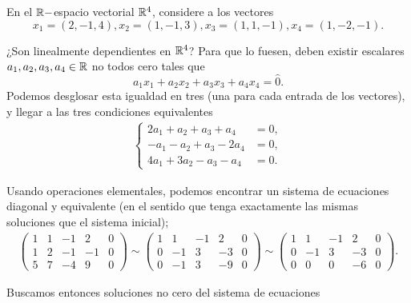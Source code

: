 \QEDB
\vspace{0.2cm}


\begin{ejem}
En el $\mathbb{R}-$espacio vectorial $\mathbb{R}^{4}$, considere a los vectores
\[
x_{1} = (2, -1, 4), x_{2} = (1, -1, 3),
x_{3} = (1, 1, -1), x_{4} = (1, -2, -1).
\]
\end{ejem}
¿Son linealmente dependientes en $\mathbb{R}^{4}$? Para que lo fuesen, 
deben existir escalares $a_{1}, a_{2}, a_{3}, a_{4} \in \mathbb{R}$
no todos cero tales que 
\[
a_{1} x_{1} + a_{2} x_{2} + a_{3}x_{3} + a_{4}x_{4} = 
\hat{0}.
\]
Podemos desglosar esta igualdad en tres (una para cada entrada
de los vectores), y llegar a las tres condiciones equivalentes
\begin{align*}
\begin{cases}
2a_{1} + a_{2} + a_{3} + a_{4} & = 0, \\
-a_{1} - a_{2} + a_{3} -2a_{4} & = 0, \\
4 a_{1} + 3 a_{2} - a_{3} - a_{4} & = 0.
\end{cases}
\end{align*}

Usando operaciones elementales, podemos encontrar un sistema
de ecuaciones diagonal y equivalente (en el sentido que tenga
exactamente las mismas soluciones que el sistema inicial);
\begin{align*}
\left( \begin{array}{rrrr|r} 
1 & 1 & -1 & 2 & 0 \\ 
1 & 2 & -1 & -1 & 0  \\ 
5 & 7 & -4 & 9 & 0  
\end{array} \right) \sim
\left( \begin{array}{rrrr|r} 
1 & 1 & -1 & 2 & 0 \\ 
0 & -1 & 3 & -3 & 0  \\ 
0 & -1 & 3 & -9 & 0  
\end{array} \right) \sim
\left( \begin{array}{rrrr|r} 
1 & 1 & -1 & 2 & 0 \\ 
0 & -1 & 3 & -3 & 0  \\ 
0 & 0 & 0 & -6 & 0  
\end{array} \right) .
\end{align*}

Buscamos entonces soluciones no cero del sistema
de ecuaciones

